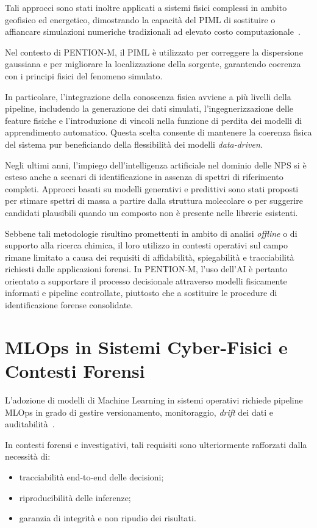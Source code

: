 Tali approcci sono stati inoltre applicati a sistemi fisici complessi in ambito geofisico ed energetico, dimostrando la capacità del PIML di sostituire o affiancare simulazioni numeriche tradizionali ad elevato costo computazionale~\cite{geoenergy_piml_review}.

Nel contesto di PENTION-M, il PIML è utilizzato per correggere la dispersione gaussiana e per migliorare la localizzazione della sorgente, garantendo coerenza con i principi fisici del fenomeno simulato.

In particolare, l’integrazione della conoscenza fisica avviene a più livelli della pipeline, includendo la generazione dei dati simulati, l’ingegnerizzazione delle feature fisiche e l’introduzione di vincoli nella funzione di perdita dei modelli di apprendimento automatico.
Questa scelta consente di mantenere la coerenza fisica del sistema pur beneficiando della flessibilità dei modelli \textit{data-driven}.

Negli ultimi anni, l’impiego dell’intelligenza artificiale nel dominio delle NPS si è esteso anche a scenari di identificazione in assenza di spettri di riferimento completi.
Approcci basati su modelli generativi e predittivi sono stati proposti per stimare spettri di massa a partire dalla struttura molecolare o per suggerire candidati plausibili quando un composto non è presente nelle librerie esistenti.

Sebbene tali metodologie risultino promettenti in ambito di analisi \textit{offline} o di supporto alla ricerca chimica, il loro utilizzo in contesti operativi sul campo rimane limitato a causa dei requisiti di affidabilità, spiegabilità e tracciabilità richiesti dalle applicazioni forensi.
In PENTION-M, l’uso dell’AI è pertanto orientato a supportare il processo decisionale attraverso modelli fisicamente informati e pipeline controllate, piuttosto che a sostituire le procedure di identificazione forense consolidate.

\section{MLOps in Sistemi Cyber-Fisici e Contesti Forensi}
\label{sec:mlops}

L’adozione di modelli di Machine Learning in sistemi operativi richiede pipeline MLOps in grado di gestire versionamento, monitoraggio, \textit{drift} dei dati e auditabilità~\cite{faubel2023mlops_industry, calefato_secmlops}.

In contesti forensi e investigativi, tali requisiti sono ulteriormente rafforzati dalla necessità di:
\begin{itemize}
    \item tracciabilità end-to-end delle decisioni;
    \item riproducibilità delle inferenze;
    \item garanzia di integrità e non ripudio dei risultati.
\end{itemize}

